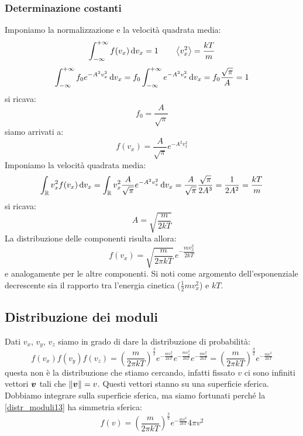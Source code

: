 \subsubsection{Determinazione costanti}
Imponiamo la normalizzazione e la velocità quadrata media:
\begin{equation}
	\int_{-\infty}^{+\infty}f(v_x)\,\mathrm{d} v_x=1\qquad\left<v_x^2\right>=\frac{kT}{m}
\end{equation}
\begin{equation}
	\int_{-\infty}^{+\infty}f_0e^{-A^2v_x^2}\,\mathrm{d} v_x=f_0\int_{-\infty}^{+\infty}e^{-A^2v_x^2}\,\mathrm{d} v_x=f_0 \frac{\sqrt{\pi}}{A}=1
\end{equation}
si ricava:
\begin{equation}
	f_0=\frac{A}{\sqrt{\pi}}
\end{equation}
siamo arrivati a:
\begin{equation}
	f(v_x)=\frac{A}{\sqrt{\pi}}e^{-A^2v_x^2}
\end{equation}
Imponiamo la velocità quadrata media:
\begin{equation}
	\int_{\mathbb{R}}v_x^2 f(v_x)\,\mathrm{d} v_x=\int_{\mathbb{R}}v_x^2\frac{A}{\sqrt{\pi}}e^{-A^2v_x^2}\,\mathrm{d} v_x=\frac{A}{\sqrt{\pi}}\frac{\sqrt{\pi}}{2A^3}=\frac{1}{2A^2}=\frac{kT}{m}
\end{equation}
si ricava:
\begin{equation}
	A=\sqrt{\frac{m}{2kT}}
\end{equation}
La distribuzione delle componenti risulta allora:
\begin{equation}
	f(v_x)=\sqrt{\frac{m}{2\pi kT}}\,e^{-\dfrac{mv_x^2}{2kT}}
\end{equation}
e analogamente per le altre componenti. Si noti come argomento dell'esponenziale decrescente sia il rapporto tra l'energia cinetica ($\frac{1}{2}mv_x^2$) e $kT$.
\subsection{Distribuzione dei moduli}
Dati $v_x$, $v_y$, $v_z$ siamo in grado di dare la distribuzione di probabilità:
\begin{equation}
	f(v_x)f(v_y)f(v_z)=\left(\frac{m}{2\pi kT}\right)^{\frac{3}{2}}e^{-\frac{mv_x^2}{2kT}}e^{-\frac{mv_y^2}{2kT}}e^{-\frac{mv_z^2}{2kT}}=\left(\frac{m}{2\pi kT}\right)^{\frac{3}{2}}e^{-\frac{mv^2}{2kT}}
	\label{distr_moduli13}
\end{equation}
questa non è la distribuzione che stiamo cercando, infatti fissato $v$ ci sono infiniti vettori $\boldsymbol{v}$ tali che $\left\lVert\boldsymbol{v}\right\rVert=v$. Questi vettori stanno su una superficie sferica. Dobbiamo integrare sulla superficie sferica, ma siamo fortunati perché la \eqref{distr_moduli13} ha simmetria sferica:
\begin{equation}
	f(v)=\left(\frac{m}{2\pi kT}\right)^{\frac{3}{2}}e^{-\frac{mv^2}{2kT}}4\pi v^2
\end{equation}
